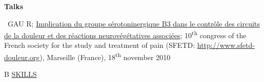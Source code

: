 \documentclass[a4paper,12pt,oneside]{letter}
\begin{document}
\begin{center}
\Large\textbf{Talks}
\end{center}

\textbullet~GAU R; \href{http://www.sfetd-douleur.org/ModuleEventPublic/viewPresentation.phtml?about=rc\%2f2010\%2f10econgres\%2f10e-congre\%2fsession\%2f20101118-0845-20\%2f1015-62\%2f_container}{Implication du groupe sérotoninergique B3 dans le contrôle des circuits de la douleur et des réactions neurovégétatives associées}; 10\textsuperscript{th} congress of the French society for the study and treatment of pain (SFETD: \url{http://www.sfetd-douleur.org}), Marseille (France), 18\textsuperscript{th} november 2010

\begin{tabular}{B}
\underline{SKILLS}
\end{tabular}
\end{document}
